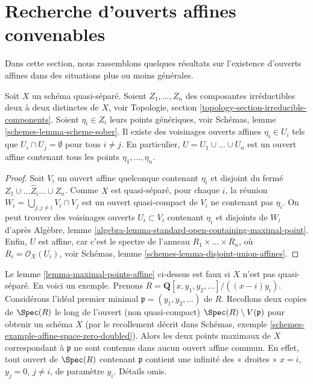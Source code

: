 \section{Recherche d'ouverts affines convenables}
\label{section-finding-affine-opens}

\noindent
Dans cette section, nous rassemblons quelques résultats sur l'existence
d'ouverts affines dans des situations plus ou moins générales.

\begin{lemma}
\label{lemma-maximal-points-affine}
Soit $X$ un schéma quasi-séparé.
Soient $Z_1, \ldots, Z_n$ des composantes irréductibles deux à deux distinctes de $X$,
voir Topologie, section \ref{topology-section-irreducible-components}.
Soient $\eta_i \in Z_i$ leurs points génériques, voir
Schémas, lemme \ref{schemes-lemma-scheme-sober}.
Il existe des voisinages ouverts affines $\eta_i \in U_i$
tels que $U_i \cap U_j = \emptyset$ pour tous $i \not = j$.
En particulier, $U = U_1 \cup \ldots \cup U_n$ est un
ouvert affine contenant tous les points $\eta_1, \ldots, \eta_n$.
\end{lemma}

\begin{proof}
Soit $V_i$ un ouvert affine quelconque contenant $\eta_i$
et disjoint du fermé $Z_1 \cup \ldots \hat Z_i \ldots \cup Z_n$.
Comme $X$ est quasi-séparé, pour chaque $i$, la réunion
$W_i = \bigcup_{j, j \not = i} V_i \cap V_j$ est un ouvert
quasi-compact de $V_i$ ne contenant pas $\eta_i$.
On peut trouver des voisinages ouverts $U_i \subset V_i$
contenant $\eta_i$ et disjoints de $W_i$ d'après
Algèbre, lemme \ref{algebra-lemma-standard-open-containing-maximal-point}.
Enfin, $U$ est affine, car c'est le spectre de
l'anneau $R_1 \times \ldots \times R_n$, où $R_i = \mathcal{O}_X(U_i)$,
voir Schémas, lemme \ref{schemes-lemma-disjoint-union-affines}.
\end{proof}

\begin{remark}
\label{remark-maximal-points-affine}
Le lemme \ref{lemma-maximal-points-affine} ci-dessus est faux si $X$
n'est pas quasi-séparé. En voici un exemple. Prenons
$R = \mathbf{Q}[x, y_1, y_2, \ldots]/((x-i)y_i)$.
Considérons l'idéal premier minimal $\mathfrak p = (y_1, y_2, \ldots)$
de $R$. Recollons deux copies de $\Spec(R)$ le long de
l'ouvert (non quasi-compact) $\Spec(R) \setminus V(\mathfrak p)$
pour obtenir un schéma $X$ (par le recollement
décrit dans Schémas, exemple \ref{schemes-example-affine-space-zero-doubled}).
Alors les deux points maximaux de $X$ correspondant à $\mathfrak p$
ne sont contenus dans aucun ouvert affine commun. En
effet, tout ouvert de $\Spec(R)$ contenant $\mathfrak p$
contient une infinité des « droites » $x = i$, $y_j = 0$,
$j \not = i$, de paramètre $y_i$. Détails omis.
\end{remark}

